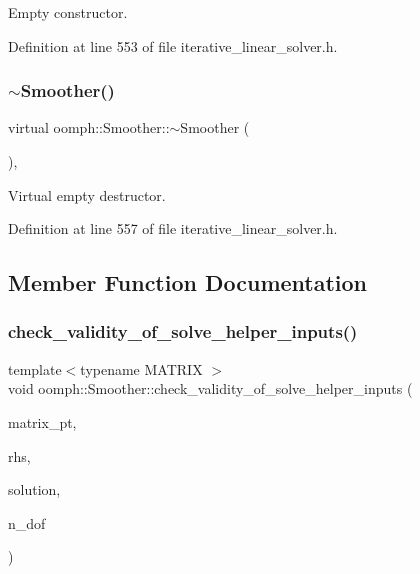 Empty constructor. 



Definition at line 553 of file iterative\+\_\+linear\+\_\+solver.\+h.

\mbox{\label{classoomph_1_1Smoother_a225c288501a99fff61317957ea6adefa}} 
\subsubsection{\texorpdfstring{$\sim$\+Smoother()}{~Smoother()}}
{\footnotesize\ttfamily virtual oomph\+::\+Smoother\+::$\sim$\+Smoother (\begin{DoxyParamCaption}{ }\end{DoxyParamCaption})\hspace{0.3cm}{\ttfamily [inline]}, {\ttfamily [virtual]}}



Virtual empty destructor. 



Definition at line 557 of file iterative\+\_\+linear\+\_\+solver.\+h.



\subsection{Member Function Documentation}
\mbox{\label{classoomph_1_1Smoother_a26a3dba61218b77cf65775475dc8751d}} 
\subsubsection{\texorpdfstring{check\+\_\+validity\+\_\+of\+\_\+solve\+\_\+helper\+\_\+inputs()}{check\_validity\_of\_solve\_helper\_inputs()}}
{\footnotesize\ttfamily template$<$typename M\+A\+T\+R\+IX $>$ \\
void oomph\+::\+Smoother\+::check\+\_\+validity\+\_\+of\+\_\+solve\+\_\+helper\+\_\+inputs (\begin{DoxyParamCaption}\item[{M\+A\+T\+R\+IX $\ast$const \&}]{matrix\+\_\+pt,  }\item[{const \hyperlink{classoomph_1_1DoubleVector}{Double\+Vector} \&}]{rhs,  }\item[{\hyperlink{classoomph_1_1DoubleVector}{Double\+Vector} \&}]{solution,  }\item[{const double \&}]{n\+\_\+dof }\end{DoxyParamCaption})}



